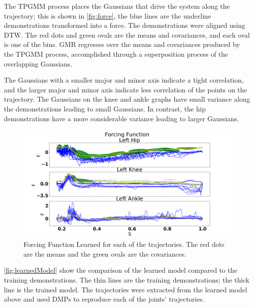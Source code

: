 The TPGMM process places the Gaussians that drive the system along the trajectory; this is shown in \autoref{fig:force}, the blue lines are the underline demonstrations transformed into a force.  The demonstrations were aligned using DTW. The red dots and green ovals are the means and covariances, and each oval is one of the bins. GMR regresses over the means and covariances produced by the TPGMM process, accomplished through a superposition process of the overlapping Gaussians. 

The Gaussians with a smaller major and minor axis indicate a tight correlation, and the larger major and minor axis indicate less correlation of the points on the trajectory.  The Gaussians on the knee and ankle graphs have small variance along the demonstrations leading to small Gaussians. In contrast, the hip demonstrations have a more considerable variance leading to larger Gaussians.    

\begin{figure}[h]
    \centering
    \includegraphics[scale=0.3]{images/gait_data/force_function2.png}
    \caption[Gait Forcing Function]{Forcing Function Learned for each of the trajectories. The red dots are the means and the green ovals are the covariances.}
    \label{fig:force}
\end{figure}



 \autoref{fig:learnedModel} show the comparison of the learned model compared to the training demonstrations. The thin lines are the training demonstrations; the thick line is the trained model. The trajectories were extracted from the learned model above and used DMPs to reproduce each of the joints' trajectories. 


